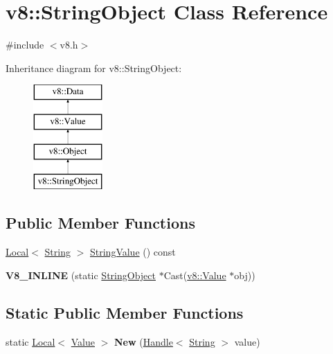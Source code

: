 \hypertarget{classv8_1_1_string_object}{}\section{v8\+:\+:String\+Object Class Reference}
\label{classv8_1_1_string_object}


{\ttfamily \#include $<$v8.\+h$>$}

Inheritance diagram for v8\+:\+:String\+Object\+:\begin{figure}[H]
\begin{center}
\leavevmode
\includegraphics[height=4.000000cm]{classv8_1_1_string_object}
\end{center}
\end{figure}
\subsection*{Public Member Functions}
\begin{DoxyCompactItemize}
\item 
\hyperlink{classv8_1_1_local}{Local}$<$ \hyperlink{classv8_1_1_string}{String} $>$ \hyperlink{classv8_1_1_string_object_a7fc2bf2ec12bedb44dc735988508ab94}{String\+Value} () const 
\item 
\hypertarget{classv8_1_1_string_object_aeb7ecd92b9fc0c4c5a2e51e166e5d19e}{}{\bfseries V8\+\_\+\+I\+N\+L\+I\+N\+E} (static \hyperlink{classv8_1_1_string_object}{String\+Object} $\ast$Cast(\hyperlink{classv8_1_1_value}{v8\+::\+Value} $\ast$obj))\label{classv8_1_1_string_object_aeb7ecd92b9fc0c4c5a2e51e166e5d19e}

\end{DoxyCompactItemize}
\subsection*{Static Public Member Functions}
\begin{DoxyCompactItemize}
\item 
\hypertarget{classv8_1_1_string_object_a299c1d30b32e8bc336c8af05471a0763}{}static \hyperlink{classv8_1_1_local}{Local}$<$ \hyperlink{classv8_1_1_value}{Value} $>$ {\bfseries New} (\hyperlink{classv8_1_1_handle}{Handle}$<$ \hyperlink{classv8_1_1_string}{String} $>$ value)\label{classv8_1_1_string_object_a299c1d30b32e8bc336c8af05471a0763}

\end{DoxyCompactItemize}



